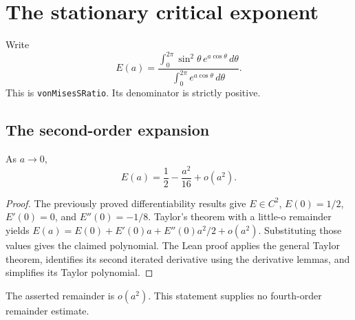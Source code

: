 \section{The stationary critical exponent}
Write
\[
 E(a)=\frac{\int_0^{2\pi}\sin^2\theta\,e^{a\cos\theta}\,d\theta}
             {\int_0^{2\pi}e^{a\cos\theta}\,d\theta}.
\]
This is \texttt{vonMisesSRatio}. Its denominator is strictly positive.

\subsection{The second-order expansion}
\begin{claim}
As $a\to0$,
\[
 E(a)=\frac12-\frac{a^2}{16}+o(a^2).
\]
\end{claim}
\begin{proof}
The previously proved differentiability results give $E\in C^2$,
$E(0)=1/2$, $E'(0)=0$, and $E''(0)=-1/8$. Taylor's theorem with a little-o
remainder yields
$E(a)=E(0)+E'(0)a+E''(0)a^2/2+o(a^2)$.
Substituting those values gives the claimed polynomial. The Lean proof applies
the general Taylor theorem, identifies its second iterated derivative using
the derivative lemmas, and simplifies its Taylor polynomial.
\end{proof}
\scope The asserted remainder is $o(a^2)$. This statement supplies no
fourth-order remainder estimate.

